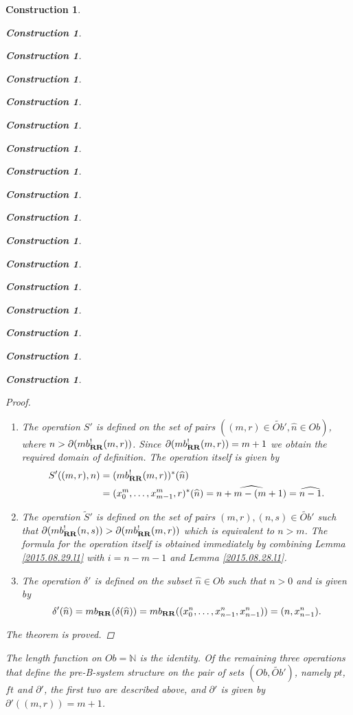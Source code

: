 \documentclass[onecolumn,12pt]{amsart}
\numberwithin{proposition}{subsection}
\newtheorem{construction}[proposition]{Construction}
\newcommand{\nn}{{\mathbb N}}
\newcommand{\nat}{\nn}
\newcommand{\wt}{\widetilde}
\newcommand{\wh}{\widehat}
\newcommand{\RR}{{\bf RR}}
\begin{document}
\begin{construction}
\begin{construction}
\begin{construction}
\begin{construction}
\begin{construction}
\begin{construction}
\begin{construction}
\begin{construction}
\begin{construction}
\begin{construction}
\begin{construction}
\begin{construction}
\begin{construction}
\begin{construction}
\begin{construction}
\begin{construction}
\begin{construction}
\begin{proof}
\begin{enumerate}
  $\partial(mb_{\RR}^!(n,s))>m-1$. Since $\partial(mb_{\RR}^!(n,s))=n+1$ we
  obtain the required domain of definition. The formula by the operation itself
  is obtained immediately by combining Lemma \ref{2015.08.29.l1} and Lemma
  \ref{2015.08.26.l3a}.
%
\item The operation $S'$ is defined on the set of pairs $((m,r)\in
  \wt{Ob}',\wh{n}\in Ob)$, where $n>\partial(mb_{\RR}^!(m,r))$. Since
  $\partial(mb_{\RR}^!(m,r))=m+1$ we obtain the required domain of
  definition. The operation itself is given by
  \begin{equation*}
    \begin{split}
      S'((m,r),n)&=(mb_{\RR}^!(m,r))^*(\wh{n})
      \\&=(x_0^m,\dots,x_{m-1}^m,r)^*(\wh{n})=\wh{n+m-(m+1)}=\wh{n-1}.
    \end{split}
  \end{equation*}
\item The operation $\wt{S}'$ is defined on the set of pairs $(m,r),(n,s)\in
  \wt{Ob}'$ such that $\partial(mb_{\RR}^!(n,s))>\partial(mb_{\RR}^!(m,r))$
  which is equivalent to $n>m$. The formula for the operation itself is
  obtained immediately by combining Lemma \ref{2015.08.29.l1} with $i=n-m-1$
  and Lemma \ref{2015.08.28.l1}.
%
\item The operation $\delta'$ is defined on the subset $\wh{n}\in Ob$ such that
  $n>0$ and is given by
%
\[\delta'(\wh{n})=mb_{\RR}(\delta(\wh{n}))=mb_{\RR}((x_0^n,\dots,x_{n-1}^n,x_{n-1}^n))=(n,x_{n-1}^n).\]
%
\end{enumerate}
%
The theorem is proved. 
\end{proof}
%
The length function on $Ob=\nat$ is the identity. Of the remaining three
operations that define the pre-B-system structure on the pair of sets
$(Ob,\wt{Ob}')$, namely $pt$, $ft$ and $\partial'$, the first two are described above,
and $\partial'$ is given by $\partial'((m,r))=m+1$.


\end{construction}
\end{construction}
\end{construction}
\end{construction}
\end{construction}
\end{construction}
\end{construction}
\end{construction}
\end{construction}
\end{construction}
\end{construction}
\end{construction}
\end{construction}
\end{construction}
\end{construction}
\end{construction}
\end{construction}
\end{document}
